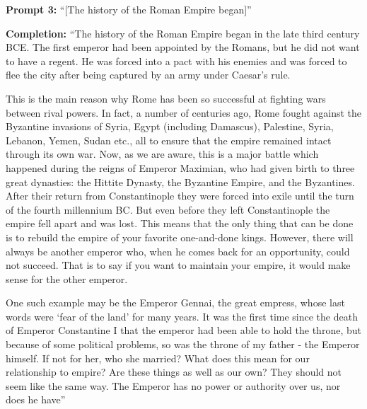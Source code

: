 \documentclass[12pt]{article}
\begin{document}
\begin{mdframed}[backgroundcolor=gray!10, roundcorner=5pt]
\raggedright
\textbf{Prompt 3:} ``[The history of the Roman Empire began]''

\textbf{Completion:} ``The history of the Roman Empire began in the late third century BCE. The first emperor had been appointed by the Romans, but he did not want to have a regent. He was forced into a pact with his enemies and was forced to flee the city after being captured by an army under Caesar's rule.

This is the main reason why Rome has been so successful at fighting wars between rival powers. In fact, a number of centuries ago, Rome fought against the Byzantine invasions of Syria, Egypt (including Damascus), Palestine, Syria, Lebanon, Yemen, Sudan etc., all to ensure that the empire remained intact through its own war. Now, as we are aware, this is a major battle which happened during the reigns of Emperor Maximian, who had given birth to three great dynasties: the Hittite Dynasty, the Byzantine Empire, and the Byzantines. After their return from Constantinople they were forced into exile until the turn of the fourth millennium BC. But even before they left Constantinople the empire fell apart and was lost. This means that the only thing that can be done is to rebuild the empire of your favorite one-and-done kings. However, there will always be another emperor who, when he comes back for an opportunity, could not succeed. That is to say if you want to maintain your empire, it would make sense for the other emperor.

One such example may be the Emperor Gennai, the great empress, whose last words were `fear of the land' for many years. It was the first time since the death of Emperor Constantine I that the emperor had been able to hold the throne, but because of some political problems, so was the throne of my father - the Emperor himself. If not for her, who she married? What does this mean for our relationship to empire? Are these things as well as our own? They should not seem like the same way. The Emperor has no power or authority over us, nor does he have''
\end{mdframed}
\end{document}
